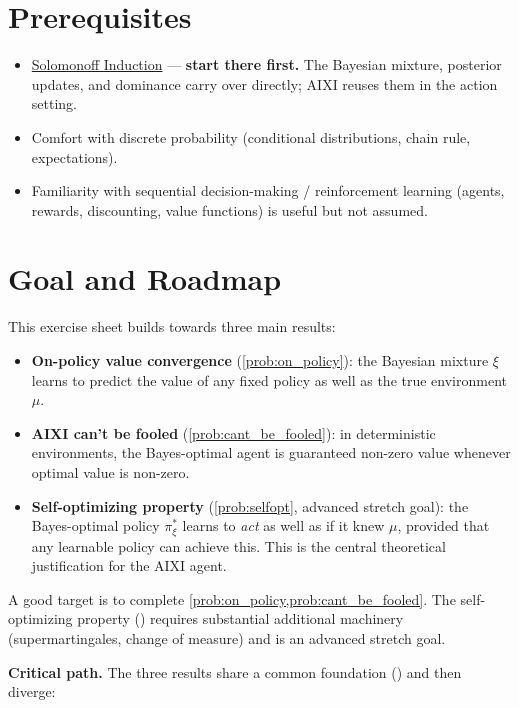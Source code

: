 \documentclass[fontsize=11pt, parskip=half]{scrartcl}
\begin{document}
\section*{Prerequisites}

\begin{itemize}
    \item \href{/agency/solomonoff-induction}{Solomonoff Induction} ---
    \textbf{start there first.} The Bayesian mixture, posterior updates, and
    dominance carry over directly; AIXI reuses them in the action setting.
    \item Comfort with discrete probability (conditional distributions, chain rule,
    expectations).
    \item Familiarity with sequential decision-making / reinforcement learning
    (agents, rewards, discounting, value functions) is useful but not assumed.
\end{itemize}

\section*{Goal and Roadmap}

This exercise sheet builds towards three main results:
\begin{itemize}\itemsep=2pt
    \item \textbf{On-policy value convergence} (\cref{prob:on_policy}): the Bayesian mixture $\xi$ learns to predict the value of any fixed policy as well as the true environment $\mu$.
    \item \textbf{AIXI can't be fooled} (\cref{prob:cant_be_fooled}): in deterministic environments, the Bayes-optimal agent is guaranteed non-zero value whenever optimal value is non-zero.
    \item \textbf{Self-optimizing property} (\cref{prob:selfopt}, advanced stretch goal): the Bayes-optimal policy $\pi_\xi^*$ learns to \emph{act} as well as if it knew $\mu$, provided that any learnable policy can achieve this. This is the central theoretical justification for the AIXI agent.
\end{itemize}
A good target is to complete \cref{prob:on_policy,prob:cant_be_fooled}. The self-optimizing property () requires substantial additional machinery (supermartingales, change of measure) and is an advanced stretch goal.

\textbf{Critical path.} The three results share a common foundation () and then diverge:
\end{document}
